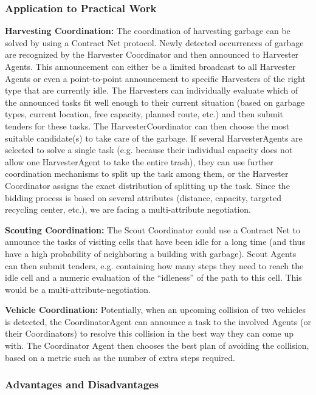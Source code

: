 \subsubsection{Application to Practical Work}

\textbf{Harvesting Coordination:} The coordination of harvesting garbage can be solved by using a Contract Net protocol. Newly detected occurrences of garbage are recognized by the Harvester Coordinator and then announced to Harvester Agents. This announcement can either be a limited broadcast to all Harvester Agents or even a point-to-point announcement to specific Harvesters of the right type that are currently idle. The Harvesters can individually evaluate which of the announced tasks fit well enough to their current situation (based on garbage types, current location, free capacity, planned route, etc.) and then submit tenders for these tasks. The HarvesterCoordinator can then choose the most suitable candidate(s) to take care of the garbage. If several HarvesterAgents are selected to solve a single task (e.g. because their individual capacity does not allow one HarvesterAgent to take the entire trash), they can use further coordination mechanisms to split up the task among them, or the Harvester Coordinator assigns the exact distribution of splitting up the task. Since the bidding process is based on several attributes (distance, capacity, targeted recycling center, etc.), we are facing a multi-attribute negotiation.

\textbf{Scouting Coordination:} The Scout Coordinator could use a Contract Net to announce the tasks of visiting cells that have been idle for a long time (and thus have a high probability of neighboring a building with garbage). Scout Agents can then submit tenders, e.g. containing how many steps they need to reach the idle cell and a numeric evaluation of the “idleness” of the path to this cell. This would be a multi-attribute-negotiation.

\textbf{Vehicle Coordination:} Potentially, when an upcoming collision of two vehicles is detected, the CoordinatorAgent can announce a task to the involved Agents (or their Coordinators) to resolve this collision in the best way they can come up with. The Coordinator Agent then chooses the best plan of avoiding the collision, based on a metric such as the number of extra steps required.

\subsubsection{Advantages and Disadvantages}

